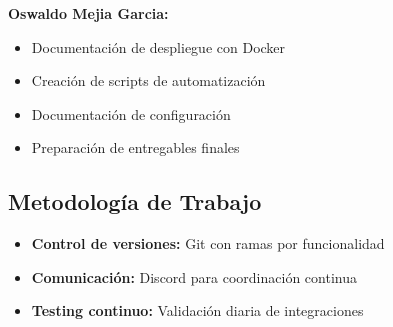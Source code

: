 \textbf{Oswaldo Mejia Garcia:}
\begin{itemize}
    \item Documentación de despliegue con Docker
    \item Creación de scripts de automatización
    \item Documentación de configuración
    \item Preparación de entregables finales
\end{itemize}

\subsection*{Metodología de Trabajo}

\begin{itemize}
    \item \textbf{Control de versiones:} Git con ramas por funcionalidad
    \item \textbf{Comunicación:} Discord para coordinación continua
    \item \textbf{Testing continuo:} Validación diaria de integraciones
\end{itemize}


